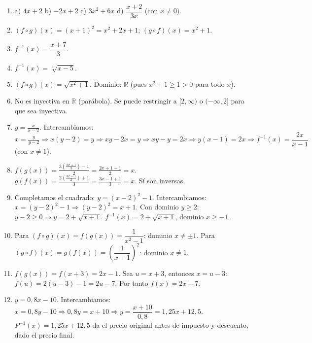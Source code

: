 \documentclass[12pt, letterpaper]{article}
\begin{document}
  \begin{enumerate}[resume=respuestas, leftmargin=*, label=\textbf{\arabic*.}]
    \item a) $4x + 2$ \quad b) $-2x + 2$ \quad c) $3x^2 + 6x$ \quad d) $\dfrac{x + 2}{3x}$ (con $x \neq 0$).

    \item $(f \circ g)(x) = (x + 1)^2 = x^2 + 2x + 1$; \quad $(g \circ f)(x) = x^2 + 1$.

    \item $f^{-1}(x) = \dfrac{x + 7}{3}$.

    \item $f^{-1}(x) = \sqrt[3]{x - 5}$.

    \item $(f \circ g)(x) = \sqrt{x^2 + 1}$. Dominio: $\mathbb{R}$ (pues $x^2 + 1 \geq 1 > 0$ para todo $x$).

    \item No es inyectiva en $\mathbb{R}$ (parábola). Se puede restringir a $[2, \infty)$ o $(-\infty, 2]$ para que sea inyectiva.

    \item $y = \frac{x}{x - 2}$. Intercambiamos: $x = \frac{y}{y - 2} \Rightarrow x(y - 2) = y \Rightarrow xy - 2x = y \Rightarrow xy - y = 2x \Rightarrow y(x - 1) = 2x \Rightarrow f^{-1}(x) = \dfrac{2x}{x - 1}$ (con $x \neq 1$).

    \item $f(g(x)) = \frac{3\left(\frac{2x + 1}{3}\right) - 1}{2} = \frac{2x + 1 - 1}{2} = x$. $g(f(x)) = \frac{2\left(\frac{3x - 1}{2}\right) + 1}{3} = \frac{3x - 1 + 1}{3} = x$. Sí son inversas.

    \item Completamos el cuadrado: $y = (x - 2)^2 - 1$. Intercambiamos: $x = (y - 2)^2 - 1 \Rightarrow (y - 2)^2 = x + 1$. Con dominio $y \geq 2$: $y - 2 \geq 0 \Rightarrow y = 2 + \sqrt{x + 1}$. $f^{-1}(x) = 2 + \sqrt{x + 1}$, dominio $x \geq -1$.

    \item Para $(f \circ g)(x) = f(g(x)) = \dfrac{1}{x^2 - 1}$: dominio $x \neq \pm 1$. Para $(g \circ f)(x) = g(f(x)) = \left(\dfrac{1}{x - 1}\right)^2$: dominio $x \neq 1$.

    \item $f(g(x)) = f(x + 3) = 2x - 1$. Sea $u = x + 3$, entonces $x = u - 3$: $f(u) = 2(u - 3) - 1 = 2u - 7$. Por tanto $f(x) = 2x - 7$.

    \item $y = 0{,}8x - 10$. Intercambiamos: $x = 0{,}8y - 10 \Rightarrow 0{,}8y = x + 10 \Rightarrow y = \dfrac{x + 10}{0{,}8} = 1{,}25x + 12{,}5$. $P^{-1}(x) = 1{,}25x + 12{,}5$ da el precio original antes de impuesto y descuento, dado el precio final.
  \end{enumerate}
\end{document}
